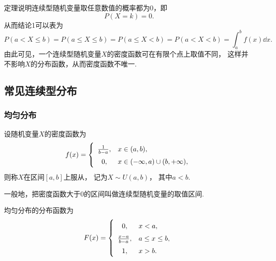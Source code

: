 定理说明连续型随机变量取任意数值的概率都为0，即\begin{equation*}
	P(X=k) = 0.
\end{equation*}
从而结论1可以表为\begin{equation*}
	P(a < X \leq b)
	= P(a \leq X \leq b)
	= P(a \leq X < b)
	= P(a < X < b)
	= \int_a^b f(x) \dd{x}.
\end{equation*}
由此可见，一个连续型随机变量\(X\)的密度函数可在有限个点上取值不同，
这样并不影响\(X\)的分布函数，从而密度函数不唯一.

\subsection{常见连续型分布}

\subsubsection{均匀分布}
\begin{definition}
设随机变量\(X\)的密度函数为\begin{equation}\label{equation:连续型分布.均匀分布的密度函数}
	f(x) = \left\{ \def\arraystretch{1.5}
	\begin{array}{cl}
		\frac{1}{b-a}, & x \in (a,b), \\
		0, & x \in (-\infty,a) \cup (b,+\infty), \\
	\end{array} \right.
\end{equation}
则称\(X\)在区间\([a,b]\)上服从，
记为\(X \sim U(a,b)\)，
其中\(a < b\).

一般地，把密度函数大于0的区间叫做连续型随机变量的取值区间.
\end{definition}

\begin{theorem}
均匀分布的分布函数为\begin{equation}
	F(x) = \left\{ \def\arraystretch{1.5}
	\begin{array}{cl}
		0, & x < a, \\
		\frac{x-a}{b-a}, & a \leq x \leq b, \\
		1, & x > b. \\
	\end{array} \right.
\end{equation}
\end{theorem}

